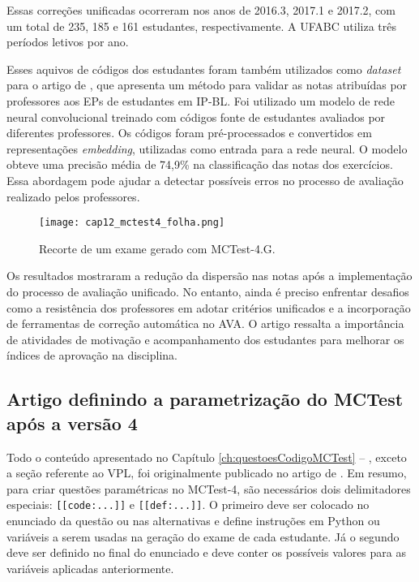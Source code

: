 Essas correções unificadas ocorreram nos anos de 2016.3, 2017.1 e 2017.2, com um total de 235, 185 e 161 estudantes, respectivamente. A UFABC utiliza três períodos letivos por ano.

Esses aquivos de códigos dos estudantes foram também utilizados como \textit{dataset} para o artigo de , que apresenta um método para validar as notas atribuídas por professores aos EPs de estudantes em IP-BL. Foi utilizado um modelo de rede neural convolucional treinado com códigos fonte de estudantes avaliados por diferentes professores. Os códigos foram pré-processados e convertidos em representações \textit{embedding}, utilizadas como entrada para a rede neural. O modelo obteve uma precisão média de 74,9\% na classificação das notas dos exercícios. Essa abordagem pode ajudar a detectar possíveis erros no processo de avaliação realizado pelos professores.

\begin{figure}[!ht]
\centering
\texttt{[image: cap12\_mctest4\_folha.png]}
\caption{Recorte de um exame gerado com MCTest-4.G.}
\label{fig:cap12_mctest4_folha}
\end{figure}

Os resultados mostraram a redução da dispersão nas notas após a implementação do processo de avaliação unificado. No entanto, ainda é preciso enfrentar desafios como a resistência dos professores em adotar critérios unificados e a incorporação de ferramentas de correção automática no AVA. O artigo ressalta a importância de atividades de motivação e acompanhamento dos estudantes para melhorar os índices de aprovação na disciplina.

\subsection{Artigo definindo a parametrização do MCTest após a versão 4}\label{sec:definindoParametrizacao}

Todo o conteúdo apresentado no Capítulo \ref{ch:questoesCodigoMCTest} -- , exceto a seção referente ao VPL, foi originalmente publicado no artigo de . Em resumo, para criar questões paramétricas no MCTest-4, são necessários dois delimitadores especiais: \verb|[[code:...]]| e \verb|[[def:...]]|. O primeiro deve ser colocado no enunciado da questão ou nas alternativas e define instruções em Python ou variáveis a serem usadas na geração do exame de cada estudante. Já o segundo deve ser definido no final do enunciado e deve conter os possíveis valores para as variáveis aplicadas anteriormente.


